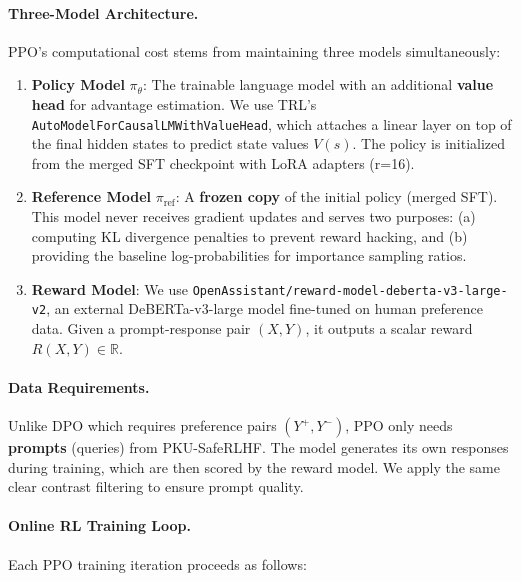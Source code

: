 \paragraph{Three-Model Architecture.} PPO's computational cost stems from maintaining three models simultaneously:

\begin{enumerate}[leftmargin=*]
    \item \textbf{Policy Model} $\pi_\theta$: The trainable language model with an additional \textbf{value head} for advantage estimation. We use TRL's \texttt{AutoModelForCausalLMWithValueHead}, which attaches a linear layer on top of the final hidden states to predict state values $V(s)$. The policy is initialized from the merged SFT checkpoint with LoRA adapters (r=16).

    \item \textbf{Reference Model} $\pi_{\text{ref}}$: A \textbf{frozen copy} of the initial policy (merged SFT). This model never receives gradient updates and serves two purposes: (a) computing KL divergence penalties to prevent reward hacking, and (b) providing the baseline log-probabilities for importance sampling ratios.

    \item \textbf{Reward Model}: We use \texttt{OpenAssistant/\allowbreak reward-model-\allowbreak deberta-v3-large-v2}, an external DeBERTa-v3-large model fine-tuned on human preference data. Given a prompt-response pair $(X, Y)$, it outputs a scalar reward $R(X, Y) \in \mathbb{R}$.
\end{enumerate}

\paragraph{Data Requirements.} Unlike DPO which requires preference pairs $(Y^+, Y^-)$, PPO only needs \textbf{prompts} (queries) from PKU-SafeRLHF. The model generates its own responses during training, which are then scored by the reward model. We apply the same clear contrast filtering to ensure prompt quality.

\paragraph{Online RL Training Loop.} Each PPO training iteration proceeds as follows:

